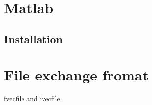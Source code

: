\documentclass[a4paper,11pt,notitlepage,final,twoside]{report}
\begin{document}
\chapter{Matlab}

\section{Installation}



\appendix                     %

\chapter{File exchange fromat}               %

fvecfile and ivecfile




\end{document}
